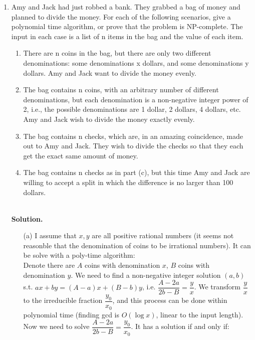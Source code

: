 \documentclass{article}
\newtheorem*{solution}{Solution}
\begin{document}
\begin{enumerate}
\begin{itemize}
\begin{itemize}
        \end{itemize}
\end{itemize}
~\\
    \item
    Amy and Jack had just robbed a bank. They grabbed a bag of money and planned to divide the money. For each of the following scenarios, give a polynomial time algorithm, or prove that the problem is NP-complete. The input in each case is a list of n items in the bag and the value of each item.
        \begin{enumerate}
            \item There are n coins in the bag, but there are only two different denominations: some denominations x dollars, and some denominations y dollars. Amy and Jack want to divide the money evenly.
            \item The bag contains n coins, with an arbitrary number of different denominations, but each denomination is a non-negative integer power of 2, i.e., the possible denominations are 1 dollar, 2 dollars, 4 dollars, etc. Amy and Jack wish to divide the money exactly evenly. 
            \item The bag contains n checks, which are, in an amazing coincidence, made out to Amy and Jack. They wish to divide the checks so that they each get the exact same amount of money.
            \item The bag contains n checks as in part (c), but this time Amy and Jack are willing to accept a split in which the difference is no larger than 100 dollars.
        \end{enumerate}
~\\
\textbf{Solution.}
\begin{itemize}
    \item [(a)]
        I assume that $x,y$ are all positive rational numbers (it seems not reasonble that the denomination of coins to be irrational numbers).
        It can be solve with a poly-time algorithm: \\
        Denote there are $A$ coins with denomination $x$, $B$ coins with denomination $y$. We need to find a non-negative integer solution $(a,b)$ s.t. $ax+by=(A-a)x+(B-b)y$, i.e. $\dfrac{A-2a}{2b-B}=\dfrac{y}{x}$.
        We transform $\dfrac{y}{x}$ to the irreducible fraction $\dfrac{y_0}{x_0}$, and this process can be done within polynomial time (finding gcd is $O(\log x)$, linear to the input length). Now we need to solve $\dfrac{A-2a}{2b-B}=\dfrac{y_0}{x_0}$. It has a solution if and only if:

\end{itemize}
\end{enumerate}
\end{document}

